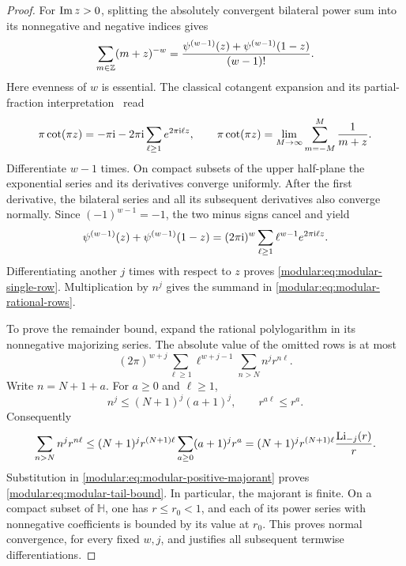 \begin{proof}
For \(\operatorname{Im} z>0\), splitting the absolutely convergent bilateral
power sum into its nonnegative and negative indices gives
\begin{equation}
\sum_{m\in\mathbb{Z}}(m+z)^{-w}
=\frac{\psi^{(w-1)}(z)+\psi^{(w-1)}(1-z)}{(w-1)!}.
\label{modular:eq:modular-bilateral-polygamma}
\end{equation}
Here evenness of \(w\) is essential. The classical cotangent expansion
and its partial-fraction interpretation~\cite{hstruct:DLMF} read
\[
\pi\cot(\pi z)=-\pi\mathrm{i}
 -2\pi\mathrm{i}\sum_{\ell\ge1}e^{2\pi\mathrm{i}\ell z},\qquad
\pi\cot(\pi z)=\lim_{M\to\infty}\sum_{m=-M}^{M}\frac1{m+z}.
\]
Differentiate \(w-1\) times. On compact subsets of the upper
half-plane the exponential series and its derivatives converge
uniformly. After the first derivative, the bilateral series and all
its subsequent derivatives also converge normally. Since
\((-1)^{w-1}=-1\), the two minus signs cancel and yield
\[
\psi^{(w-1)}(z)+\psi^{(w-1)}(1-z)
=(2\pi\mathrm{i})^w\sum_{\ell\ge1}\ell^{w-1}e^{2\pi\mathrm{i}\ell z}.
\]
Differentiating another \(j\) times with respect to \(z\) proves
\eqref{modular:eq:modular-single-row}. Multiplication by \(n^j\) gives the
summand in \eqref{modular:eq:modular-rational-rows}.

To prove the remainder bound, expand the rational polylogarithm in
its nonnegative majorizing series. The absolute value of the omitted
rows is at most
\begin{equation}
(2\pi)^{w+j}\sum_{\ell\ge1}\ell^{w+j-1}
                  \sum_{n>N}n^j r^{n\ell}.
\label{modular:eq:modular-positive-majorant}
\end{equation}
Write \(n=N+1+a\). For \(a\ge0\) and \(\ell\ge1\),
\[
n^j\le(N+1)^j(a+1)^j,\qquad r^{a\ell}\le r^a.
\]
Consequently
\[
\sum_{n>N}n^j r^{n\ell}
\le (N+1)^j r^{(N+1)\ell}
       \sum_{a\ge0}(a+1)^j r^a
=(N+1)^j r^{(N+1)\ell}\frac{\operatorname{Li}_{-j}(r)}{r}.
\]
Substitution in \eqref{modular:eq:modular-positive-majorant} proves
\eqref{modular:eq:modular-tail-bound}. In particular, the majorant is finite.
On a compact subset of \(\mathbb H\), one has \(r\le r_0<1\), and
each of its power series with nonnegative coefficients is bounded by
its value at \(r_0\). This proves normal convergence, for every fixed
\(w,j\), and justifies all subsequent termwise differentiations.
\end{proof}

